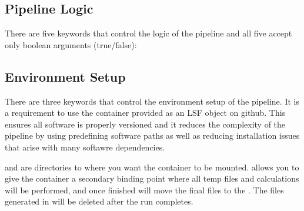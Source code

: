 \documentclass[letterpaper,10pt,english]{sphinxmanual}
\begin{document}
\subsection{Pipeline Logic}
\label{\detokenize{decipheringConfig:pipeline-logic}}
There are five keywords that control the logic of the pipeline and all five accept only boolean arguments (true/false):

\begin{sphinxVerbatim}[commandchars=\\\{\}]
\end{sphinxVerbatim}


\subsection{Environment Setup}
\label{\detokenize{decipheringConfig:environment-setup}}
There are three keywords that control the environment setup of the pipeline. It is a requirement to use the container provided as an LSF object on github. This ensures all software is properly versioned and it reduces the complexity of the pipeline by using predefining software paths as well as reducing installation issues that arise with many softawre dependencies.

\begin{sphinxVerbatim}[commandchars=\\\{\}]
\end{sphinxVerbatim}

 and  are directories to where you want the container to be mounted.   allows you to give the container a secondary binding point where all temp files and calculations will be performed, and once finished will move the final files to the .  The files generated in  will be deleted after the run completes.
\end{document}
